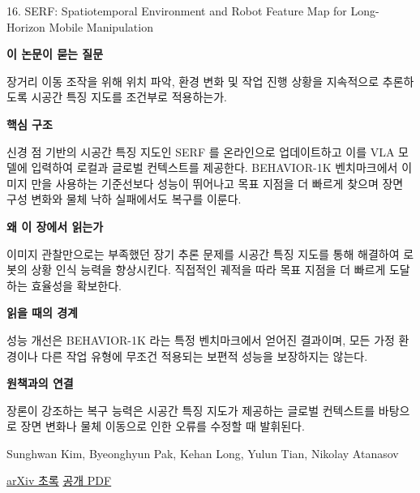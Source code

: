 \documentclass[11pt,openany]{book}
\begin{document}
\begin{termcard}{16. SERF: Spatiotemporal Environment and Robot Feature Map for Long-Horizon Mobile Manipulation}

\par

\medskip

{\sffamily\bfseries\color{deepblue} 이 논문이 묻는 질문}\par

장거리 이동 조작을 위해 위치 파악, 환경 변화 및 작업 진행 상황을 지속적으로 추론하도록 시공간 특징 지도를 조건부로 적용하는가.

\smallskip

{\sffamily\bfseries\color{deepblue} 핵심 구조}\par

신경 점 기반의 시공간 특징 지도인 SERF 를 온라인으로 업데이트하고 이를 VLA 모델에 입력하여 로컬과 글로벌 컨텍스트를 제공한다. BEHAVIOR-1K 벤치마크에서 이미지 만을 사용하는 기준선보다 성능이 뛰어나고 목표 지점을 더 빠르게 찾으며 장면 구성 변화와 물체 낙하 실패에서도 복구를 이룬다.

\smallskip

{\sffamily\bfseries\color{deepblue} 왜 이 장에서 읽는가}\par

이미지 관찰만으로는 부족했던 장기 추론 문제를 시공간 특징 지도를 통해 해결하여 로봇의 상황 인식 능력을 향상시킨다. 직접적인 궤적을 따라 목표 지점을 더 빠르게 도달하는 효율성을 확보한다.

\smallskip

{\sffamily\bfseries\color{coral} 읽을 때의 경계}\par

성능 개선은 BEHAVIOR-1K 라는 특정 벤치마크에서 얻어진 결과이며, 모든 가정 환경이나 다른 작업 유형에 무조건 적용되는 보편적 성능을 보장하지는 않는다.

\smallskip

{\sffamily\bfseries\color{teal} 원책과의 연결}\par

장론이 강조하는 복구 능력은 시공간 특징 지도가 제공하는 글로벌 컨텍스트를 바탕으로 장면 변화나 물체 이동으로 인한 오류를 수정할 때 발휘된다.

\medskip

{\footnotesize\color{muted} Sunghwan Kim, Byeonghyun Pak, Kehan Long, Yulun Tian, Nikolay Atanasov\par

\href{https://arxiv.org/abs/2606.12956}{arXiv 초록} \quad \href{https://arxiv.org/pdf/2606.12956}{공개 PDF}\par}

\end{termcard}
\end{document}

